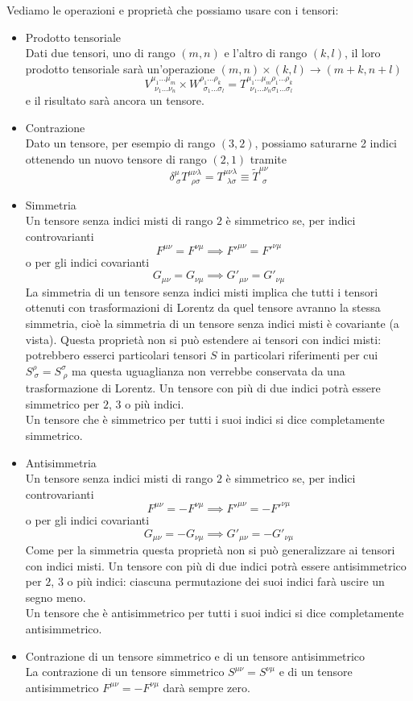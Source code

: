 \documentclass[12pt,a4paper,titlepage, twoside, openright]{book}
\numberwithin{equation}{chapter}
\begin{document}
Vediamo le operazioni e proprietà che possiamo usare con i tensori:
\begin{itemize}
\item Prodotto tensoriale \\
Dati due tensori, uno di rango $(m,n)$ e l'altro di rango $(k,l)$, il loro prodotto tensoriale sarà un'operazione $(m,n)\times(k,l)\rightarrow (m+k,n+l)$
\[
V^{\mu_1\dots\mu_m}_{\>\> \nu_1\dots\nu_n} \times W^{\rho_1\dots\rho_k}_{\>\> \sigma_1\dots\sigma_l} = T^{\mu_1\dots\mu_m\rho_1\dots\rho_k}_{\>\> \nu_1\dots\nu_n\sigma_1\dots\sigma_l}
\]
e il risultato sarà ancora un tensore.

\item Contrazione\\
Dato un tensore, per esempio di rango $(3,2)$, possiamo saturarne 2 indici ottenendo un nuovo tensore di rango $(2,1)$ tramite
\[
\delta^{\mu}_{\> \sigma}T^{\mu\nu\lambda}_{\>\> \rho\sigma}=T^{\mu\nu\lambda}_{\>\> \lambda\sigma}\equiv \tilde{T}^{\mu\nu}_{\>\> \sigma}
\]

\item Simmetria \\
Un tensore senza indici misti di rango $2$ è simmetrico se, per indici controvarianti
\[
F^{\mu\nu}=F^{\nu\mu} \implies F'^{\mu\nu}=F'^{\nu\mu}
\]
o per gli indici covarianti
\[
G_{\mu\nu}=G_{\nu\mu} \implies G'_{\mu\nu}=G'_{\nu\mu}
\]
La simmetria di un tensore senza indici misti implica che tutti i tensori ottenuti con trasformazioni di Lorentz da quel tensore avranno la stessa simmetria, cioè la simmetria di un tensore senza indici misti è covariante (a vista).
Questa proprietà non si può estendere ai tensori con indici misti: potrebbero esserci particolari tensori $S$ in particolari riferimenti per cui $S^{\rho}_{\>\sigma}=S^{\sigma}_{\>\rho}$ ma questa uguaglianza non verrebbe conservata da una trasformazione di Lorentz.
Un tensore con più di due indici potrà essere simmetrico per $2$, $3$ o più indici.\\ Un tensore che è simmetrico per tutti i suoi indici si dice completamente simmetrico.
\item Antisimmetria \\
Un tensore senza indici misti di rango $2$ è simmetrico se, per indici controvarianti
\[
F^{\mu\nu}=-F^{\nu\mu} \implies F'^{\mu\nu}=-F'^{\nu\mu}
\]
o per gli indici covarianti
\[
G_{\mu\nu}=-G_{\nu\mu} \implies G'_{\mu\nu}=-G'_{\nu\mu}
\]
Come per la simmetria questa proprietà non si può generalizzare ai tensori con indici misti.
Un tensore con più di due indici potrà essere antisimmetrico per $2$, $3$ o più indici: ciascuna permutazione dei suoi indici farà uscire un segno meno. \\
Un tensore che è antisimmetrico per tutti i suoi indici si dice completamente antisimmetrico.
\item Contrazione di un tensore simmetrico e di un tensore antisimmetrico\\
La contrazione di un tensore simmetrico $S^{\mu\nu}=S^{\nu\mu}$ e di un tensore antisimmetrico $F^{\mu\nu}=-F^{\nu\mu}$ darà sempre zero.
\end{itemize}
\end{document}
